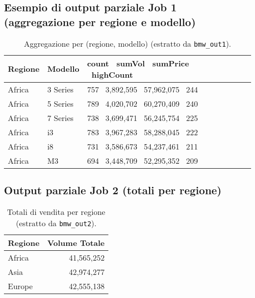 		\subsection*{Esempio di output parziale Job 1 (aggregazione per regione e modello)}
			\begin{table}[H]
				\centering
				\begin{tabular}{l l l l l l}
					\hline
					\textbf{Regione} & \textbf{Modello} & \textbf{count \textbar\ sumVol \textbar\ sumPrice \textbar\ highCount}  \\
					\hline
					Africa                & 3 Series         & \hspace{3mm} 757 \textbar\ 3,892,595 \textbar\ 57,962,075 \textbar\ 244 \\
					Africa                & 5 Series         & \hspace{3mm} 789 \textbar\ 4,020,702 \textbar\ 60,270,409 \textbar\ 240 \\
					Africa                & 7 Series         & \hspace{3mm} 738 \textbar\ 3,699,471 \textbar\ 56,245,754 \textbar\ 225 \\
					Africa                & i3               & \hspace{3mm} 783 \textbar\ 3,967,283 \textbar\ 58,288,045 \textbar\ 222 \\
					Africa                & i8               & \hspace{3mm} 731 \textbar\ 3,586,673 \textbar\ 54,237,461 \textbar\ 211 \\
					Africa                & M3               & \hspace{3mm} 694 \textbar\ 3,448,709 \textbar\ 52,295,352 \textbar\ 209 \\
					\hline
				\end{tabular}
				\caption{Aggregazione per (regione, modello) (estratto da \texttt{bmw\_out1}).}
				\label{tab:mr_output1}
			\end{table}
		
		\subsection*{Output parziale Job 2 (totali per regione)}
			\begin{table}[H]
				\centering
				\begin{tabular}{l r}
					\hline
					\textbf{Regione} & \textbf{Volume Totale} \\
					\hline
					Africa                & 41,565,252             \\
					Asia                  & 42,974,277             \\
					Europe                & 42,555,138             \\
					\hline
				\end{tabular}
				\caption{Totali di vendita per regione (estratto da \texttt{bmw\_out2}).}
				\label{tab:mr_output2}
			\end{table}
		
